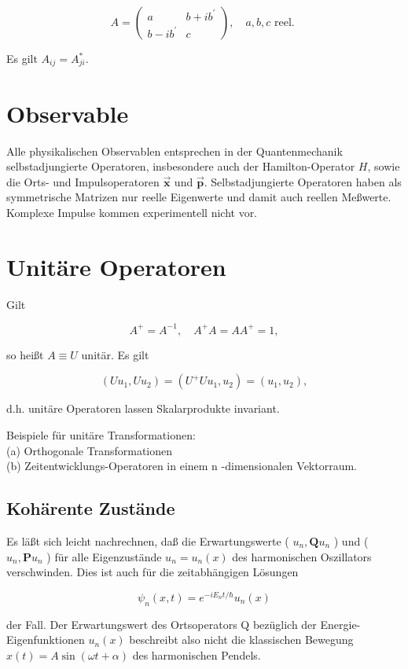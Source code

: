 \documentclass[10pt, letterpaper]{article}
\begin{document}
$$
A=\left(\begin{array}{cc}
a & b+i b^{\prime} \\
b-i b^{\prime} & c
\end{array}\right), \quad a, b, c \text { reel. }
$$

Es gilt $A_{i j}=A_{j i}^{*}$.

\section*{Observable}
Alle physikalischen Observablen entsprechen in der Quantenmechanik selbstadjungierte Operatoren, insbesondere auch der Hamilton-Operator $H$, sowie die Orts- und Impulsoperatoren $\overrightarrow{\mathbf{x}}$ und $\overrightarrow{\mathbf{p}}$. Selbstadjungierte Operatoren haben als symmetrische Matrizen nur reelle Eigenwerte und damit auch reellen Meßwerte. Komplexe Impulse kommen experimentell nicht vor.

\section*{Unitäre Operatoren}
Gilt

$$
A^{+}=A^{-1}, \quad A^{+} A=A A^{+}=1,
$$

so heißt $A \equiv U$ unitär. Es gilt

$$
\left(U u_{1}, U u_{2}\right)=\left(U^{+} U u_{1}, u_{2}\right)=\left(u_{1}, u_{2}\right),
$$

d.h. unitäre Operatoren lassen Skalarprodukte invariant.

Beispiele für unitäre Transformationen:\\
(a) Orthogonale Transformationen\\
(b) Zeitentwicklungs-Operatoren in einem n -dimensionalen Vektorraum.

\subsection*{Kohärente Zustände}
Es läßt sich leicht nachrechnen, daß die Erwartungswerte ( $u_{n}, \mathbf{Q} u_{n}$ ) und ( $u_{n}, \mathbf{P} u_{n}$ ) für alle Eigenzustände $u_{n}=u_{n}(x)$ des harmonischen Oszillators verschwinden. Dies ist auch für die zeitabhängigen Lösungen

$$
\psi_{n}(x, t)=e^{-i E_{n} t / \hbar} u_{n}(x)
$$

der Fall. Der Erwartungswert des Ortsoperators Q bezüglich der Energie-Eigenfunktionen $u_{n}(x)$ beschreibt also nicht die klassischen Bewegung $x(t)=A \sin (\omega t+\alpha)$ des harmonischen Pendels.
\end{document}
